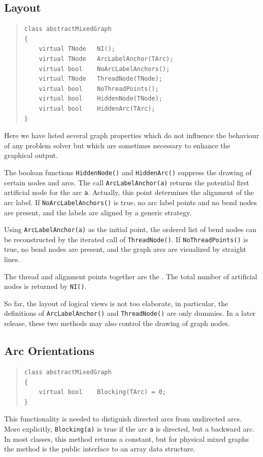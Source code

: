 \documentclass[a4paper,11pt,twoside]{book}
\begin{document}
\begin{multicols}{2}
\subsection{Layout}
\label{slb_layout}
\methods
\begin{quote}
\begin{verbatim}
class abstractMixedGraph
{
    virtual TNode   NI();
    virtual TNode   ArcLabelAnchor(TArc);
    virtual bool    NoArcLabelAnchors();
    virtual TNode   ThreadNode(TNode);
    virtual bool    NoThreadPoints();
    virtual bool    HiddenNode(TNode);
    virtual bool    HiddenArc(TArc);
}
\end{verbatim}
\end{quote}
Here we have listed several graph properties which do not influence the
behaviour of any problem solver but which are sometimes necessary to enhance
the graphical output.

The boolean functions \verb/HiddenNode()/ and \verb/HiddenArc()/ suppress the
drawing of certain nodes and arcs. The call \verb/ArcLabelAnchor(a)/ returns the
potential first artificial node for the arc \verb/a/. Actually, this point
determines the alignment of the arc label. If \verb/NoArcLabelAnchors()/ is true,
no arc label points and no bend nodes are present, and the labels are
aligned by a generic strategy.

Using \verb/ArcLabelAnchor(a)/ as the initial point, the ordered list of bend nodes
can be reconstructed by the iterated call of \verb/ThreadNode()/. If
\verb/NoThreadPoints()/ is true, no bend nodes are present, and the
graph arcs are visualized by straight lines.

The thread and alignment points together are the .
The total number of artificial nodes is returned by \verb/NI()/.

So far, the layout of logical views is not too elaborate, in particular, the
definitions of \verb/ArcLabelAnchor()/ and \verb/ThreadNode()/ are only dummies. In a later
release, these two methods may also control the drawing of graph nodes.


\subsection{Arc Orientations}
\label{slb_orient}
\methods
\begin{quote}
\begin{verbatim}
class abstractMixedGraph
{
    virtual bool    Blocking(TArc) = 0;
}
\end{verbatim}
\end{quote}
This functionality is needed to distiguish directed arcs from undirected arcs.
More explicitly, \verb/Blocking(a)/ is true if the arc \verb/a/ is directed,
but a backward arc. In most classes, this method returns a constant, but
for physical mixed graphs the method is the public interface to an array data
structure.



\end{multicols}
\end{document}
